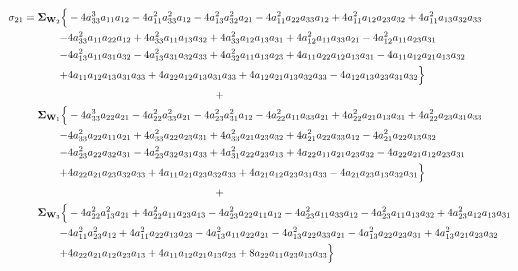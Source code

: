 \documentclass{article}
\begin{document}
\begin{equation}
\begin{aligned}
\sigma_{21} =  \mathbf{\Sigma}_{\textbf{W}_{2}} \Bigl\{ & -4 a_{33}^{3} a_{11} a_{12} - 4 a_{11}^{2} a_{33}^{2} a_{12} - 4 a_{13}^{2} a_{32}^{2} a_{21} - 4 a_{11}^{2} a_{22} a_{33} a_{12} + 4 a_{11}^{2} a_{12} a_{23} a_{32} + 4 a_{11}^{2} a_{13} a_{32} a_{33} \\
-&4 a_{33}^{2} a_{11} a_{22} a_{12} + 4 a_{33}^{2} a_{11} a_{13} a_{32} + 4 a_{33}^{2} a_{12} a_{13} a_{31} + 4 a_{12}^{2} a_{11} a_{33} a_{21} - 4a_{12}^{2} a_{11} a_{23} a_{31} \\
-&4 a_{13}^{2} a_{11} a_{31} a_{32} - 4 a_{13}^{2} a_{31} a_{32} a_{33} + 4 a_{32}^{2} a_{11} a_{13} a_{23} + 4 a_{11} a_{22} a_{12} a_{13} a_{31} - 4 a_{11} a_{12}a_{21} a_{13} a_{32} \\
+&4 a_{11} a_{12} a_{13} a_{31} a_{33} + 4 a_{22} a_{12} a_{13} a_{31} a_{33} + 4 a_{12} a_{21} a_{13} a_{32} a_{33} - 4 a_{12} a_{13} a_{23} a_{31} a_{32}\Bigr\} \\
& \qquad \qquad \qquad \qquad \qquad \qquad \qquad + \\
\mathbf{\Sigma}_{\textbf{W}_{1}} \Bigl\{& -4 a_{33}^{3} a_{22} a_{21} - 4 a_{22}^{2} a_{33}^{2} a_{21} - 4 a_{23}^{2} a_{31}^{2} a_{12} - 4 a_{22}^{2} a_{11} a_{33} a_{21} + 4 a_{22}^{2} a_{21} a_{13} a_{31} + 4 a_{22}^{2} a_{23} a_{31} a_{33} \\
-&4 a_{33}^{2} a_{22} a_{11} a_{21} + 4 a_{33}^{2} a_{22} a_{23} a_{31} + 4 a_{33}^{2} a_{21} a_{23} a_{32} + 4 a_{21}^{2} a_{22} a_{33} a_{12} - 4 a_{21}^{2} a_{22} a_{13} a_{32} \\
-&4 a_{23}^{2} a_{22} a_{32} a_{31} - 4 a_{23}^{2} a_{32} a_{31} a_{33} + 4 a_{31}^{2} a_{22} a_{23} a_{13} + 4 a_{22} a_{11} a_{21} a_{23} a_{32} - 4 a_{22} a_{21} a_{12} a_{23} a_{31} \\
+&4 a_{22} a_{21} a_{23} a_{32} a_{33} + 4 a_{11} a_{21} a_{23} a_{32} a_{33} + 4 a_{21} a_{12} a_{23} a_{31} a_{33} - 4 a_{21} a_{23} a_{13} a_{32} a_{31}\Bigr\} \\
& \qquad \qquad \qquad \qquad \qquad \qquad \qquad + \\
\mathbf{\Sigma}_{\textbf{W}_{3}} \Bigl\{& -4a_{22}^{2} a_{13}^{2} a_{21} + 4 a_{22}^{2} a_{11} a_{23} a_{13} - 4 a_{23}^{2} a_{22} a_{11} a_{12} - 4 a_{23}^{2} a_{11} a_{33} a_{12} - 4 a_{23}^{2} a_{11} a_{13} a_{32} + 4 a_{23}^{2} a_{12} a_{13} a_{31} \\
-&4 a_{11}^{2} a_{23}^{2} a_{12} + 4 a_{11}^{2} a_{22} a_{13} a_{23} - 4 a_{13}^{2} a_{11} a_{22} a_{21} - 4 a_{13}^{2} a_{22} a_{33} a_{21} - 4 a_{13}^{2} a_{22} a_{23} a_{31} + 4 a_{13}^{2} a_{21} a_{23} a_{32} \\
+&4 a_{22} a_{21} a_{12} a_{23} a_{13} + 4 a_{11} a_{12} a_{21} a_{13} a_{23} + 8 a_{22} a_{11} a_{23} a_{13} a_{33}\Bigr\}
\end{aligned}
\label{eq:network3by3_sigma21}
\end{equation}
\end{document}
